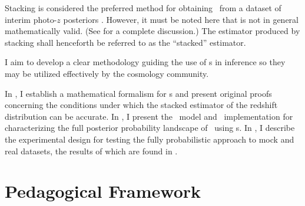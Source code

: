 Stacking is considered the preferred method for obtaining \Nz\ from a dataset of interim photo-$z$ posteriors \citep{Sheldon2012, Kelly2014, Benjamin2013, Bonnett2015a, Viironen2015, Asorey2016}.  
However, it must be noted here that  is not in general mathematically valid.  
(See \citet{Hogg2012} for a complete discussion.)  
The estimator produced by stacking shall henceforth be referred to as the ``stacked'' estimator.

I aim to develop a clear methodology guiding the use of \pzpdf s in inference so they may be utilized effectively by the cosmology community.


In , I establish a mathematical formalism for \pzpdf s and present original proofs concerning the conditions under which the stacked estimator of the redshift distribution can be accurate.
In , I present the \Chippr\ model and \chippr\ implementation for characterizing the full posterior probability landscape of \Nz\ using \pzpdf s. 
In , I describe the experimental design for testing the fully probabilistic approach to mock and real datasets, the results of which are found in .


\section{Pedagogical Framework}

